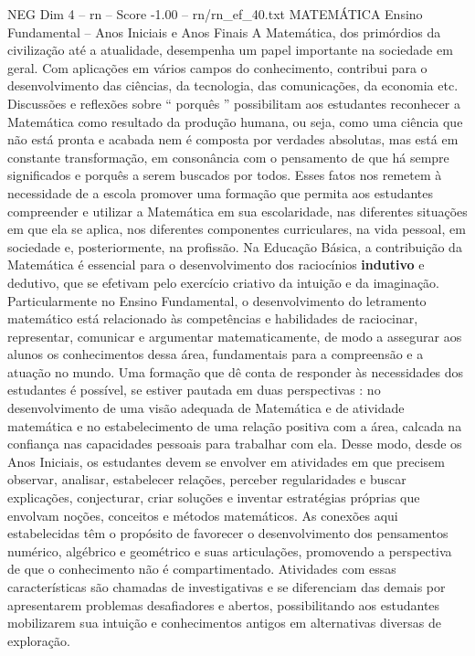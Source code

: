 \begin{textsample}{NEG Dim 4 – rn – Score -1.00 – rn/rn\_ef\_40.txt}  \label{ex:f4_neg_206}
MATEMÁTICA Ensino Fundamental – Anos Iniciais e Anos Finais A Matemática, dos primórdios da civilização até a atualidade, desempenha um papel importante na sociedade em geral.
Com aplicações em vários campos do conhecimento, contribui para o desenvolvimento das ciências, da tecnologia, das comunicações, da economia etc.
Discussões e reflexões sobre “ porquês ” possibilitam aos estudantes reconhecer a Matemática como resultado da produção humana, ou seja, como uma ciência que não está pronta e acabada nem é composta por verdades absolutas, mas está em constante transformação, em consonância com o pensamento de que há sempre significados e porquês a serem buscados por todos.
Esses fatos nos remetem à necessidade de a escola promover uma formação que permita aos estudantes compreender e utilizar a Matemática em sua escolaridade, nas diferentes situações em que ela se aplica, nos diferentes componentes curriculares, na vida pessoal, em sociedade e, posteriormente, na profissão.
Na Educação Básica, a contribuição da Matemática é essencial para o desenvolvimento dos raciocínios \textbf{indutivo} e dedutivo, que se efetivam pelo exercício criativo da intuição e da imaginação.
Particularmente no Ensino Fundamental, o desenvolvimento do letramento matemático está relacionado às competências e habilidades de raciocinar, representar, comunicar e argumentar matematicamente, de modo a assegurar aos alunos os conhecimentos dessa área, fundamentais para a compreensão e a atuação no mundo.
Uma formação que dê conta de responder às necessidades dos estudantes é possível, se estiver pautada em duas perspectivas : no desenvolvimento de uma visão adequada de Matemática e de atividade matemática e no estabelecimento de uma relação positiva com a área, calcada na confiança nas capacidades pessoais para trabalhar com ela.
Desse modo, desde os Anos Iniciais, os estudantes devem se envolver em atividades em que precisem observar, analisar, estabelecer relações, perceber regularidades e buscar explicações, conjecturar, criar soluções e inventar estratégias próprias que envolvam noções, conceitos e métodos matemáticos.
As conexões aqui estabelecidas têm o propósito de favorecer o desenvolvimento dos pensamentos numérico, algébrico e geométrico e suas articulações, promovendo a perspectiva de que o conhecimento não é compartimentado.
Atividades com essas características são chamadas de investigativas e se diferenciam das demais por apresentarem problemas desafiadores e abertos, possibilitando aos estudantes mobilizarem sua intuição e conhecimentos antigos em alternativas diversas de exploração.

\end{textsample}
